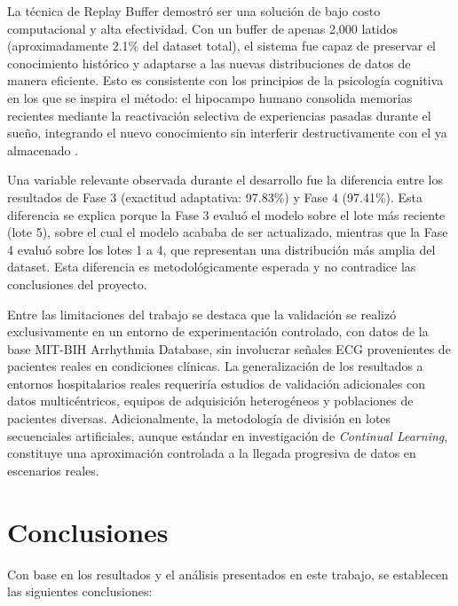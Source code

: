 La técnica de Replay Buffer demostró ser una solución de bajo costo computacional y alta efectividad. Con un buffer de apenas 2,000 latidos (aproximadamente 2.1\% del dataset total), el sistema fue capaz de preservar el conocimiento histórico y adaptarse a las nuevas distribuciones de datos de manera eficiente. Esto es consistente con los principios de la psicología cognitiva en los que se inspira el método: el hipocampo humano consolida memorias recientes mediante la reactivación selectiva de experiencias pasadas durante el sueño, integrando el nuevo conocimiento sin interferir destructivamente con el ya almacenado \cite{McCloskey1989}.

Una variable relevante observada durante el desarrollo fue la diferencia entre los resultados de Fase 3 (exactitud adaptativa: 97.83\%) y Fase 4 (97.41\%). Esta diferencia se explica porque la Fase 3 evaluó el modelo sobre el lote más reciente (lote 5), sobre el cual el modelo acababa de ser actualizado, mientras que la Fase 4 evaluó sobre los lotes 1 a 4, que representan una distribución más amplia del dataset. Esta diferencia es metodológicamente esperada y no contradice las conclusiones del proyecto.

Entre las limitaciones del trabajo se destaca que la validación se realizó exclusivamente en un entorno de experimentación controlado, con datos de la base MIT-BIH Arrhythmia Database, sin involucrar señales ECG provenientes de pacientes reales en condiciones clínicas. La generalización de los resultados a entornos hospitalarios reales requeriría estudios de validación adicionales con datos multicéntricos, equipos de adquisición heterogéneos y poblaciones de pacientes diversas. Adicionalmente, la metodología de división en lotes secuenciales artificiales, aunque estándar en investigación de \textit{Continual Learning}, constituye una aproximación controlada a la llegada progresiva de datos en escenarios reales.

\section{Conclusiones}

Con base en los resultados y el análisis presentados en este trabajo, se establecen las siguientes conclusiones:

